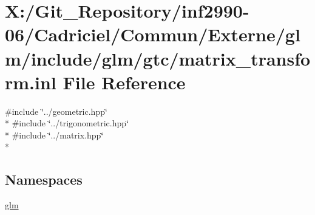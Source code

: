 \hypertarget{matrix__transform_8inl}{\section{X\-:/\-Git\-\_\-\-Repository/inf2990-\/06/\-Cadriciel/\-Commun/\-Externe/glm/include/glm/gtc/matrix\-\_\-transform.inl File Reference}
\label{matrix__transform_8inl}
}
{\ttfamily \#include \char`\"{}../geometric.\-hpp\char`\"{}}\\*
{\ttfamily \#include \char`\"{}../trigonometric.\-hpp\char`\"{}}\\*
{\ttfamily \#include \char`\"{}../matrix.\-hpp\char`\"{}}\\*
\subsection*{Namespaces}
\begin{DoxyCompactItemize}
\item 
\hyperlink{namespaceglm}{glm}
\end{DoxyCompactItemize}
